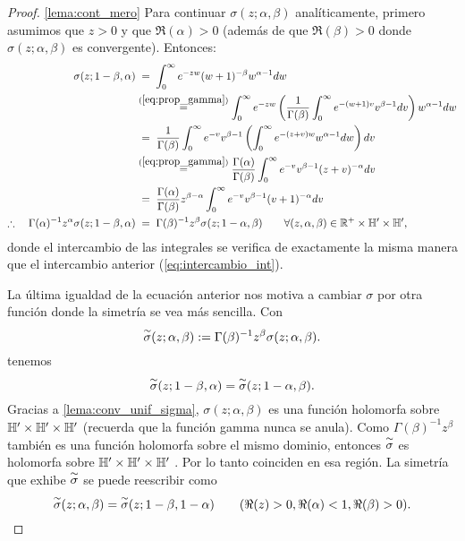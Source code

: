 \documentclass[../../tesis_maestria]{subfiles}
\begin{document}
\begin{proof}\ref{lema:cont_mero}
  Para continuar $\sigma(z;\alpha,\beta)$ anal\'iticamente, primero asumimos que $z>0$ y que
$\Re(\alpha)>0$ (adem\'as de que $\Re(\beta)>0$ donde $\sigma(z;\alpha,\beta)$ es convergente).
Entonces:
\begin{align*}
  \sigma(z;1-\beta,\alpha)
  &\;=\;\int_0^{\infty}e^{-zw}(w+1)^{-\beta}w^{\alpha-1}dw\\
  &\overset{(\ref{eq:prop_gamma})}{=}
    \int_0^{\infty}
    e^{-zw}\left( \frac{1}{\Gamma(\beta)}\int_0^{\infty}e^{-(w+1)v}v^{\beta-1}dv \right)w^{\alpha-1}dw\\
  &\;=\;\frac{1}{\Gamma(\beta)}\int_0^{\infty}
    e^{-v}v^{\beta-1}\left( \int_0^{\infty}e^{-(z+v)w}w^{\alpha-1}dw \right)dv\\
  &\overset{(\ref{eq:prop_gamma})}{=}
    \frac{\Gamma(\alpha)}{\Gamma(\beta)}\int_0^{\infty}
    e^{-v}v^{\beta-1}(z+v)^{-\alpha}dv\\
  &\;=\;\frac{\Gamma(\alpha)}{\Gamma(\beta)}z^{\beta-\alpha}\int_0^{\infty}
    e^{-v}v^{\beta-1}(v+1)^{-\alpha}dv\\
  \therefore\quad \Gamma(\alpha)^{-1}z^{\alpha}\sigma(z;1-\beta,\alpha)
  &\;=\;\Gamma(\beta)^{-1}z^{\beta}\sigma(z;1-\alpha,\beta)
    \qquad\forall (z,\alpha,\beta)\in\mathbb{R}^+\times\mathbb{H}'\times\mathbb{H}',
\end{align*}
donde el intercambio de las integrales se verifica de exactamente la misma manera que el
intercambio anterior (\ref{eq:intercambio_int}).

La \'ultima igualdad de la ecuaci\'on anterior nos motiva a cambiar $\sigma$ por otra funci\'on
donde la simetr\'ia se vea m\'as sencilla. Con
\[
  \overset{\sim}{\sigma}(z;\alpha,\beta):=\Gamma(\beta)^{-1}z^{\beta}\sigma(z;\alpha,\beta).
\]
tenemos
\[
  \overset{\sim}{\sigma}(z;1-\beta,\alpha)=\overset{\sim}{\sigma}(z;1-\alpha,\beta).
\]
Gracias a \ref{lema:conv_unif_sigma}, $\sigma(z;\alpha,\beta)$ es una funci\'on
holomorfa sobre $\mathbb{H}'\times\mathbb{H}'\times\mathbb{H}'$ (recuerda que la funci\'on gamma nunca se anula).
Como $\Gamma(\beta)^{-1}z^{\beta}$ tambi\'en es una funci\'on holomorfa sobre el mismo dominio,
entonces $\overset{\sim}{\sigma}$ es holomorfa sobre $\mathbb{H}'\times\mathbb{H}'\times\mathbb{H}'$ . Por lo tanto coinciden en
esa regi\'on. La simetr\'ia que exhibe $\overset{\sim}{\sigma}$ se puede reescribir como
\begin{equation}\label{eq:sim_st}
  \overset{\sim}{\sigma}(z;\alpha,\beta)=\overset{\sim}{\sigma}(z;1-\beta,1-\alpha)\qquad (\Re(z)>0,\Re(\alpha)<1,\Re(\beta)>0).
\end{equation}


\end{proof}
\end{document}
